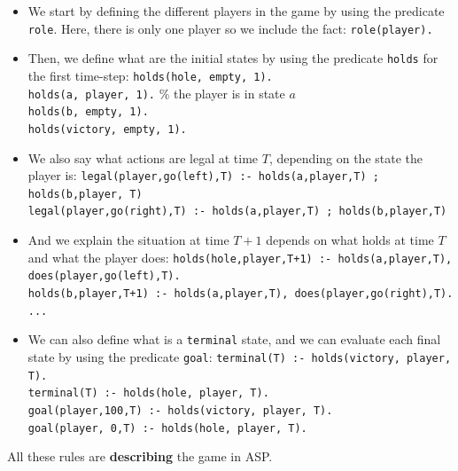 \begin{itemize}

\item We start by defining the different players in the game by using the predicate \texttt{role}. Here, there is only one player so we include the fact: \texttt{role(player).}

\smallskip

\item Then, we define what are the initial states by using the predicate \texttt{holds} for the first time-step:\newline
\texttt{holds(hole, empty, 1).}\\
\texttt{holds(a, player, 1).} \% the player is in state $a$\\
\texttt{holds(b, empty, 1).}\\
\texttt{holds(victory, empty, 1).}

\item We also say what actions are legal at time $T$, depending on the state the player is:\newline
\texttt{legal(player,go(left),T) :- holds(a,player,T) ; holds(b,player, T)}\\
\texttt{legal(player,go(right),T) :- holds(a,player,T) ; holds(b,player,T)}

\item And we explain the situation at time $T+1$ depends on what holds at time $T$ and what the player does:\newline
\texttt{holds(hole,player,T+1) :- holds(a,player,T), does(player,go(left),T).}\\
\texttt{holds(b,player,T+1) :- holds(a,player,T), does(player,go(right),T).}\\
\texttt{...}

\item We can also define what is a \texttt{terminal} state, and we can evaluate each final state by using the predicate \texttt{goal}: \newline
\texttt{terminal(T) :- holds(victory, player, T).}\\
\texttt{terminal(T) :- holds(hole, player, T).}\\
\texttt{goal(player,100,T) :- holds(victory, player, T).}\\
\texttt{goal(player,  0,T) :- holds(hole, player, T).}
\end{itemize}

All these rules are \textbf{describing} the game in ASP.

\bigskip

